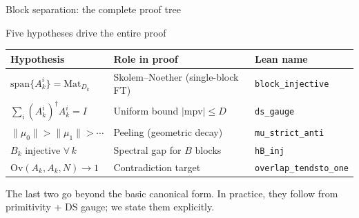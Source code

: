 \documentclass[aspectratio=169,10pt]{beamer}
\newcommand{\Mat}{\mathrm{Mat}}
\newcommand{\Span}{\mathrm{span}}
\newcommand{\Ov}{\mathrm{Ov}}
\begin{document}
\begin{frame}{Block separation: the complete proof tree}
\begin{center}
    \end{center}
\end{frame}

\begin{frame}{Five hypotheses drive the entire proof}
    \vspace{-0.6em}

    \renewcommand{\arraystretch}{1.2}
    \begin{tabular}{p{} p{} p{}}
        \toprule
        \textbf{Hypothesis}                & \textbf{Role in proof}              & \textbf{Lean name}             \\
        \midrule
        \rowcolor{cardbg}
        $\Span\{A_k^i\} = \Mat_{D_k}$      & Skolem--Noether (single-block FT)   & \texttt{block\_injective}      \\
        \rowcolor{cardbg}
        $\sum_i (A_k^i)^\dagger A_k^i = I$ & Uniform bound $|\mathrm{mpv}|\le D$ & \texttt{ds\_gauge}             \\
        \rowcolor{cardbg}
        $\|\mu_0\|>\|\mu_1\|>\cdots$       & Peeling (geometric decay)           & \texttt{mu\_strict\_anti}      \\
        \rowcolor{cardbg}
        $B_k$ injective $\forall\, k$      & Spectral gap for $B$ blocks         & \texttt{hB\_inj}               \\
        \rowcolor{cardbg}
        $\Ov(A_k,A_k,N)\to 1$              & Contradiction target                & \texttt{overlap\_tendsto\_one} \\
        \bottomrule
    \end{tabular}

    \vspace{0.3em}
    \textcolor{dimwhite}{\footnotesize The last two go beyond the basic canonical form.
        In practice, they follow from primitivity + DS gauge; we state them explicitly.}
\end{frame}

\end{document}
